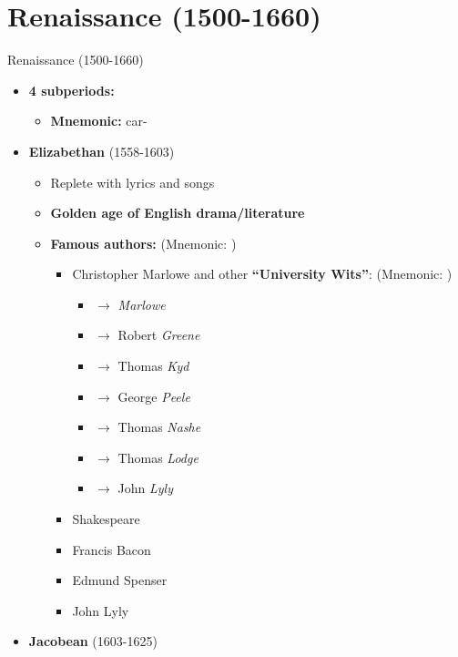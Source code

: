 \documentclass[
  12pt,
    progressbar=frametitle]{beamer}
\providecommand{\tightlist}{%
  \setlength{\itemsep}{0pt}\setlength{\parskip}{0pt}}
\begin{document}
\section{Renaissance (1500-1660)}
\begin{frame}[allowframebreaks]
{Renaissance (1500-1660)}
\begin{itemize}
\tightlist
\item
  \textbf{4 subperiods:}

  \begin{itemize}
  \tightlist
  \item
    \textbf{Mnemonic:}  car-
  \end{itemize}
\item
  \textbf{Elizabethan} (1558-1603)

  \begin{itemize}
  \tightlist
  \item
    Replete with lyrics and songs
  \item
    \textbf{Golden age of English drama/literature}
  \item
    \textbf{Famous authors:} (Mnemonic:
    )

    \begin{itemize}
    \tightlist
    \item
      Christopher Marlowe and other \textbf{``University Wits''}:
      (Mnemonic: )

      \begin{itemize}
      \tightlist
      \item
         \(\rightarrow\) \emph{Marlowe}
      \item
         \(\rightarrow\) Robert \emph{Greene}
      \item
         \(\rightarrow\) Thomas \emph{Kyd}
      \item
         \(\rightarrow\) George \emph{Peele}
      \item
         \(\rightarrow\) Thomas \emph{Nashe}
      \item
         \(\rightarrow\) Thomas \emph{Lodge}
      \item
         \(\rightarrow\) John \emph{Lyly}
      \end{itemize}
    \item
      Shakespeare
    \item
      Francis Bacon
    \item
      Edmund Spenser
    \item
      John Lyly
    \end{itemize}
  \end{itemize}
\item
  \textbf{Jacobean} (1603-1625)


\end{itemize}
\end{frame}
\end{document}
